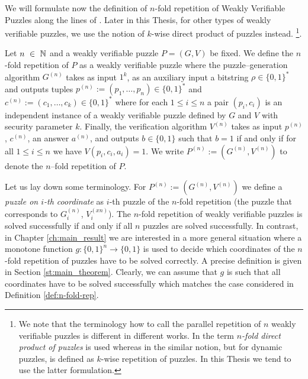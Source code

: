 We will formulate now the definition of $n$-fold repetition of Weakly Verifiable Puzzles along the lines of \cite{canetti2004hardness}.
Later in this Thesis, for other types of weakly verifiable puzzles, we use the notion of $k$-wise direct product of puzzles instead.
\footnote{We note that the terminology how to call the parallel repetition of $n$ weakly verifiable puzzles is different in different works.
In \cite{canetti2004hardness} the term \textit{$n$-fold direct product of puzzles} is used whereas in \cite{Dodis:2009:SAI:1530441.1530450} the similar
notion, but for dynamic puzzles, is defined as $k$-wise repetition of puzzles. In this Thesis we tend to use the latter formulation.}.
%
\begin{definition}
  \label{def:n-fold-rep}
  Let $n~\in~\mathbb{N}$ and a weakly verifiable puzzle $P = (G,V)$ be fixed.
  We define the $n$-fold repetition of $P$ as a weakly verifiable puzzle where the puzzle--generation algorithm
  $G^{(n)}$ takes as input $1^k$, as an auxiliary input a bitstring $\rho \in \{0,1\}^{*}$
  and outputs tuples $p^{(n)} := (p_1, \dotsc, p_n) \in \{0,1\}^{*}$ and $c^{(n)} := (c_1, \dotsc, c_k) \in \{0,1\}^{*}$
  where for each $1 \leq i \leq n$ a pair $(p_i, c_i)$ is an independent instance of a weakly verifiable puzzle defined by $G$ and $V$ with security parameter $k$.
  Finally, the verification algorithm $V^{(n)}$ takes as input $p^{(n)}$, $c^{(n)}$, an answer $a^{(n)}$, and outputs $b \in \{0,1\}$
  such that $b = 1$ if and only if for all $1 \leq i \leq n$ we have $V(p_i, c_i, a_i) = 1$.
  We write $P^{(n)} := (G^{(n)}, V^{(n)})$ to denote the $n$--fold repetition of $P$.
 \end{definition}
%
Let us lay down some terminology.
For $P^{(n) } := (G^{(n)},V^{(n)})$ we define a \textit{puzzle on $i$-th coordinate} as $i$-th puzzle of the $n$-fold repetition
(the puzzle that corresponds to $G^{(n)}_i$,  $V^{(xn)}_i$).
The $n$-fold repetition of weakly verifiable puzzles is solved successfully if and only if all $n$ puzzles are solved successfully.
In contrast, in Chapter \ref{ch:main_result} we are interested in a more general situation where a monotone function $g: \{0,1\}^{n} \rightarrow \{0,1\}$ is used to decide
which coordinates of the $n$-fold repetition of puzzles have to be solved correctly. A precise definition is given in Section \ref{st:main_theorem}.
Clearly, we can assume that $g$ is such that all coordinates have to be solved successfully which matches the case considered in Definition \ref{def:n-fold-rep}.

